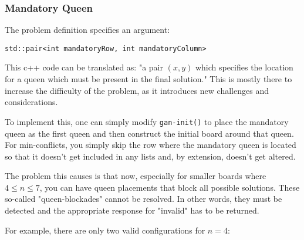 \documentclass{article}
\begin{document}
\subsubsection{Mandatory Queen}
The problem definition specifies an argument:

\begin{lstlisting}
std::pair<int mandatoryRow, int mandatoryColumn>
\end{lstlisting}

This c++ code can be translated as: "a pair $(x, y)$ which specifies the location for a queen which must be present in the final solution."
This is mostly there to increase the difficulty of the problem, as it introduces new challenges and considerations.

To implement this, one can simply modify \texttt{gan-init()} to place the mandatory queen as the first queen and then construct the initial board around that queen.
For min-conflicts, you simply skip the row where the mandatory queen is located so that it doesn't get included in any lists and, by extension, doesn't get altered.

The problem this causes is that now, especially for smaller boards where \(4 \leq n \leq 7\),
you can have queen placements that block all possible solutions. These so-called "queen-blockades" cannot be resolved.
In other words, they must be detected and the appropriate response for "invalid" has to be returned.

For example, there are only two valid configurations for \(n = 4\):
\end{document}

